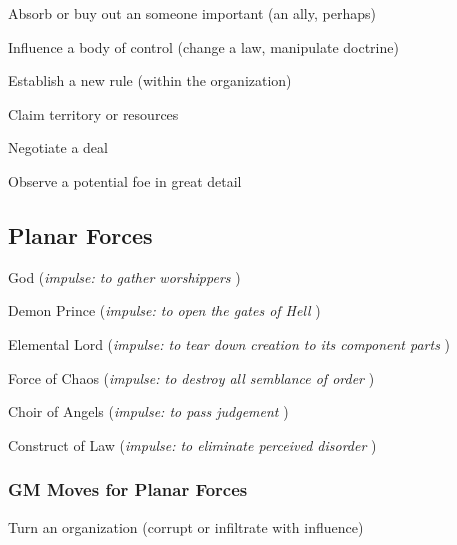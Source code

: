  
\item Absorb or buy out an someone important (an ally, perhaps)

 
\item Influence a body of control (change a law, manipulate doctrine)

 
\item Establish a new rule (within the organization)

 
\item Claim territory or resources

 
\item Negotiate a deal

 
\item Observe a potential foe in great detail


\stopitemize
 
\subsection{Planar Forces}    
 
\startitemize[1,packed]

\item God ({\em impulse: to gather worshippers} )

 
\item Demon Prince ({\em impulse: to open the gates of Hell} )

 
\item Elemental Lord ({\em impulse: to tear down creation to its component parts} )

 
\item Force of Chaos ({\em impulse: to destroy all semblance of order} )

 
\item Choir of Angels ({\em impulse: to pass judgement} )

 
\item Construct of Law ({\em impulse: to eliminate perceived disorder} )


\stopitemize
 
\subsubsection{GM Moves for Planar Forces}      
 
\startitemize[1,packed]

\item Turn an organization (corrupt or infiltrate with influence)

